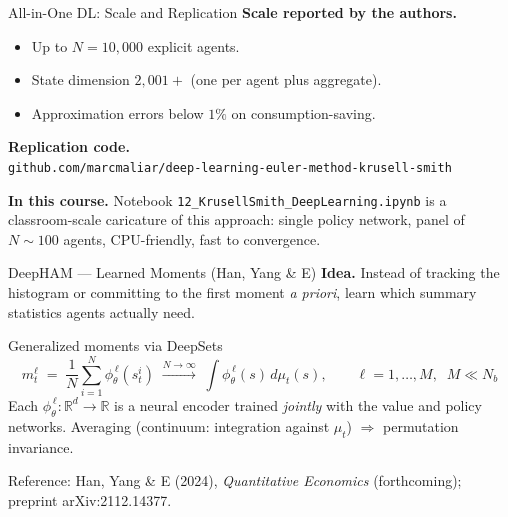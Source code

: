 \documentclass[aspectratio=169,11pt]{beamer}
\newcommand{\emphc}[1]{\textcolor{harvardcrimson}{#1}}
\newcommand{\R}{\mathbb{R}}
\begin{document}
\begin{frame}{All-in-One DL: Scale and Replication}
\small
\textbf{Scale reported by the authors.}
\begin{itemize}\itemsep1pt
    \item Up to $N = 10{,}000$ explicit agents.
    \item State dimension $2{,}001+$ (one per agent plus aggregate).
    \item Approximation errors below $1\%$ on consumption-saving.
\end{itemize}

\vspace{0.4em}
\textbf{Replication code.}\\
\texttt{github.com/marcmaliar/deep-learning-euler-method-krusell-smith}

\vspace{0.4em}
\textbf{In this course.}  Notebook \texttt{12\_KrusellSmith\_DeepLearning.ipynb} is a classroom-scale caricature of this approach: single policy network, panel of $N \sim 100$ agents, CPU-friendly, fast to convergence.
\end{frame}

\begin{frame}{DeepHAM --- Learned Moments (Han, Yang \& E)}
\small
\textbf{Idea.}  Instead of tracking the histogram or committing to the first moment \emph{a priori}, \emphc{learn} which summary statistics agents actually need.

\vspace{0.4em}
\begin{block}{Generalized moments via DeepSets}
\footnotesize
\begin{equation*}
m_t^\ell \;=\; \frac{1}{N}\sum_{i=1}^{N} \phi_\theta^{\,\ell}(s_t^i) \;\xrightarrow{N\to\infty}\; \int \phi_\theta^{\,\ell}(s)\, d\mu_t(s), \qquad \ell = 1,\ldots,M, \;\; M \ll N_b
\end{equation*}
Each $\phi_\theta^{\,\ell}:\R^d\!\to\!\R$ is a neural encoder trained \emph{jointly} with the value and policy networks.  Averaging (continuum: integration against $\mu_t$) $\Rightarrow$ permutation invariance.
\end{block}

\vspace{0.4em}
{\scriptsize Reference: Han, Yang \& E (2024), \emph{Quantitative Economics} (forthcoming); preprint arXiv:2112.14377.}
\end{frame}
\end{document}
